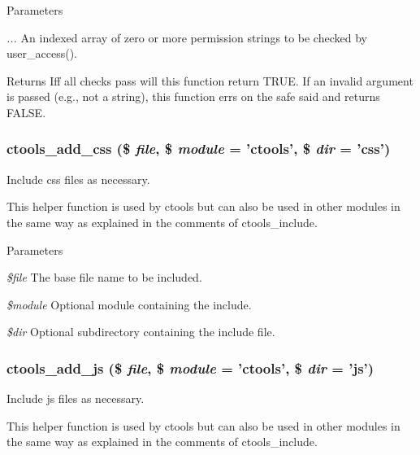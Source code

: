 \begin{DoxyParams}{Parameters}
\item[{\em ...}]An indexed array of zero or more permission strings to be checked by user\_\-access().\end{DoxyParams}
\begin{DoxyReturn}{Returns}
Iff all checks pass will this function return TRUE. If an invalid argument is passed (e.g., not a string), this function errs on the safe said and returns FALSE. 
\end{DoxyReturn}
\hypertarget{ctools_8module_a7b78eac67e8823a71bee58235355be22}{
\subsubsection[{ctools\_\-add\_\-css}]{\setlength{\rightskip}{0pt plus 5cm}ctools\_\-add\_\-css (\$ {\em file}, \/  \$ {\em module} = {\ttfamily 'ctools'}, \/  \$ {\em dir} = {\ttfamily 'css'})}}
\label{ctools_8module_a7b78eac67e8823a71bee58235355be22}
Include css files as necessary.

This helper function is used by ctools but can also be used in other modules in the same way as explained in the comments of ctools\_\-include.


\begin{DoxyParams}{Parameters}
\item[{\em \$file}]The base file name to be included. \item[{\em \$module}]Optional module containing the include. \item[{\em \$dir}]Optional subdirectory containing the include file. \end{DoxyParams}
\hypertarget{ctools_8module_abfc334b854ec27961cfb3f07382fb370}{
\subsubsection[{ctools\_\-add\_\-js}]{\setlength{\rightskip}{0pt plus 5cm}ctools\_\-add\_\-js (\$ {\em file}, \/  \$ {\em module} = {\ttfamily 'ctools'}, \/  \$ {\em dir} = {\ttfamily 'js'})}}
\label{ctools_8module_abfc334b854ec27961cfb3f07382fb370}
Include js files as necessary.

This helper function is used by ctools but can also be used in other modules in the same way as explained in the comments of ctools\_\-include.


